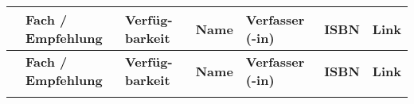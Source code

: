 \begin{longtable}{|p{}|p{}|p{}|p{}|p{}|p{}|p{}|}
\hline
\rowcolor{gray!50} \textbf{} & \textbf{Fach / Empfehlung} & \textbf{Verfüg- barkeit} & \textbf{Name} & \textbf{Verfasser (-in)} & \textbf{ISBN} & \textbf{Link} \\
\hline
\endfirsthead
\hline
\rowcolor{gray!50} \textbf{} & \textbf{Fach / Empfehlung} & \textbf{Verfüg- barkeit} & \textbf{Name} & \textbf{Verfasser (-in)} & \textbf{ISBN} & \textbf{Link} \\
\hline
\endhead
\hline
\endfoot







\end{longtable}
